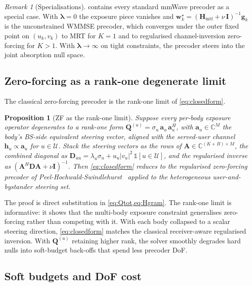 \documentclass[journal,twocolumn,10pt]{IEEEtran}
\theoremstyle{plain}
\newtheorem{proposition}[theorem]{Proposition}
\theoremstyle{remark}
\newtheorem{remark}[theorem]{Remark}
\newcommand{\hh}{\mathbf{h}}
\newcommand{\ww}{\mathbf{w}}
\newcommand{\gvec}{\mathbf{g}}
\newcommand{\Qmat}{\mathbf{Q}}
\newcommand{\Hintf}{\mathbf{H}_{\mathrm{intf}}}
\newcommand{\Complex}{\mathbb{C}}
\newcommand{\Served}{\mathcal{U}}
\begin{document}
\begin{remark}[Specialisations]\label{rem:limits}
 contains every standard mmWave precoder as a
special case. With $\bm\lambda = 0$ the exposure piece vanishes and
$\ww_k^\star = (\Hintf + \nu\,\mathbf{I})^{-1} \gvec_k$ is the
unconstrained WMMSE precoder, which converges under the outer
fixed point on $(u_k, v_k)$ to MRT for $K = 1$ and to regularised
channel-inversion zero-forcing for $K > 1$. With $\bm\lambda \to
\infty$ on tight constraints, the precoder steers into the joint
absorption null space.
\end{remark}

\subsection{Zero-forcing as a rank-one degenerate limit}

The classical zero-forcing precoder is the rank-one limit of
\cref{eq:closedform}.

\begin{proposition}[ZF as the rank-one limit]\label{prop:ZFlimit}
Suppose every per-body exposure operator degenerates to a rank-one
form $\Qmat^{(u)} = \sigma_u\,\mathbf{a}_u\,\mathbf{a}_u^H$, with
$\mathbf{a}_u \in \Complex^M$ the body's BS-side equivalent steering
vector, aligned with the served-user channel $\hh_u \propto
\mathbf{a}_u$ for $u \in \Served$. Stack the steering vectors as the
rows of $\mathbf{A} \in \Complex^{(K+B)\times M}$, the combined
diagonal as $\mathbf{D}_{uu} = \lambda_u \sigma_u + u_u |v_u|^2\,
\mathbb{1}[u \in \Served]$, and the regularised inverse as
$(\mathbf{A}^H \mathbf{D} \mathbf{A} + \nu \mathbf{I})^{-1}$. Then
\cref{eq:closedform} reduces to the regularised zero-forcing
precoder of Peel-Hochwald-Swindlehurst~\cite{PeelHochwald2005}
applied to the heterogeneous user-and-bystander steering set.
\end{proposition}

The proof is direct substitution in \cref{eq:Qtot,eq:Hgram}. The
rank-one
limit is informative: it shows that the multi-body exposure
constraint generalises zero-forcing rather than competing with it.
With each body collapsed to a scalar steering direction,
\cref{eq:closedform} matches the classical receiver-aware
regularised inversion. With $\Qmat^{(u)}$ retaining higher rank, the
solver smoothly degrades hard nulls into soft-budget back-offs that
spend less precoder DoF.

\subsection{Soft budgets and DoF cost}\label{sec:softbudget}
\end{document}
